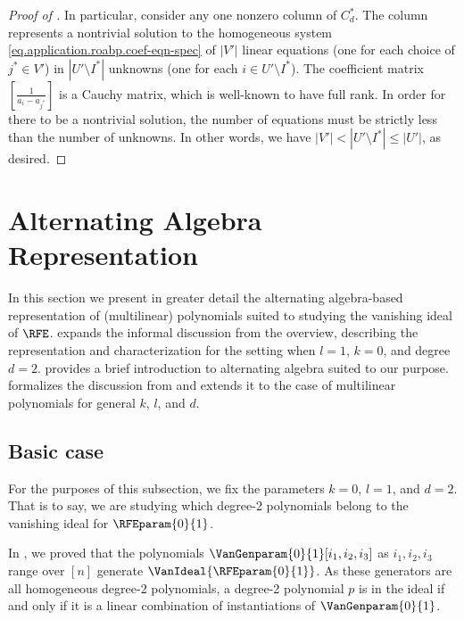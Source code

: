 \documentclass{toc}
\begin{document}
\begin{proof}[Proof of ]
  In particular, consider any one nonzero column of \(C^*_d\).
  The column represents a nontrivial solution to the homogeneous system
  \eqref{eq.application.roabp.coef-eqn-spec} of $|V'|$ linear equations
  (one for each choice of $j^* \in V'$) in $|U' \setminus I^*|$ unknowns
  (one for each $i \in U' \setminus I^*$).
  The coefficient matrix $[ \frac{1}{a_i - a_{j^*}} ]$ is a Cauchy matrix,
  which is well-known to have full rank.
  In order for there to be a nontrivial solution,
  the number of equations must be strictly less than the number of unknowns.
  In other words,
  we have \(|V'| < |U'\setminus I^*| \le |U'|\),
  as desired.
\end{proof}


\section{Alternating Algebra Representation}
\label{s.simplicial-repr}

In this section we present in greater detail the alternating
algebra-based representation of (multilinear) polynomials suited to studying the vanishing ideal of \(\RFE\).
 expands the informal discussion from the overview,
describing the representation and characterization for
the setting when \(l=1\), \(k=0\), and degree $d=2$.
 provides a brief
introduction to alternating algebra suited to our purpose. 
formalizes the discussion from  and
extends it to the case of multilinear polynomials for general \(k\), \(l\), and \(d\).

\subsection{Basic case}
\label{s.simplicial-repr.base-case}

For the purposes of this subsection, we fix the parameters \(k=0\), \(l=1\), and \(d=2\).
That is to say, we are studying which degree-2 polynomials  belong to the vanishing ideal for \(\RFEparam{0}{1}\). 

In ,
we proved that the polynomials \(\VanGenparam{0}{1}[i_1, i_2, i_3]\) as
\(i_1,i_2,i_3\) range over \([n]\) generate \(\VanIdeal{\RFEparam{0}{1}}\).
As these generators are all homogeneous degree-2 polynomials,
a degree-2 polynomial $p$ is in the ideal if and only if it is a linear
combination of instantiations of \(\VanGenparam{0}{1}\). 
\end{document}
